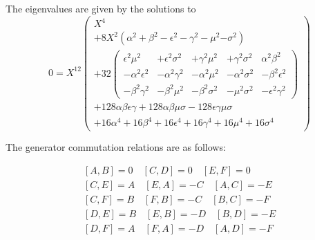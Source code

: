 \documentclass[12pt]{article}
\begin{document}
The eigenvalues are given by the solutions to
\begin{displaymath}
0 = X^{12} \left(
\begin{array}{c}
X^4  \\
+8 X^2 \left( \alpha^2 \right.+ \beta^2 -\epsilon^2 -\gamma^2 -\mu^2 \left. -\sigma^2 \right)\\
+ 32 \left(
\begin{array}{ccccc}
 \epsilon^2 \mu^2 &+ \epsilon^2\sigma^2 &+\gamma^2\mu^2 &+\gamma^2 \sigma^2
&\alpha^2 \beta^2 \\
 -\alpha^2\epsilon^2 &-\alpha^2\gamma^2 &-\alpha^2 \mu^2 &-\alpha^2 \sigma^2 
&-\beta^2\epsilon^2 \\
 -\beta^2 \gamma^2 &-\beta^2 \mu^2 &-\beta^2 \sigma^2 &-\mu^2 \sigma^2
&-\epsilon^2 \gamma^2
\end{array} \right) \\
 +128\alpha\beta\epsilon\gamma + 128\alpha\beta\mu\sigma
 -128\epsilon\gamma\mu\sigma    \\
 +16 \alpha^4 +16\beta^4 + 16\epsilon^4 + 16\gamma^4 + 16\mu^4 +16\sigma^4 
\end{array}
\right)
\end{displaymath}

 The generator commutation relations are as follows:

\begin{eqnarray*}
\left[ A,B \right] = 0 \quad\left[ C,D \right] = 0 \quad\left[ E,F \right] = 0\\
\left[ C,E \right] = A \quad\left[ E,A \right] = -C \quad\left[ A,C \right] = -E\\
\left[ C,F \right] = B \quad\left[ F,B \right] = -C \quad\left[ B,C \right] = -F\\
\left[ D,E \right] = B \quad\left[ E,B \right] = -D \quad\left[ B,D \right] = -E\\
\left[ D,F \right] = A \quad\left[ F,A \right] = -D \quad\left[ A,D \right] = -F
\end{eqnarray*}
\end{document}
